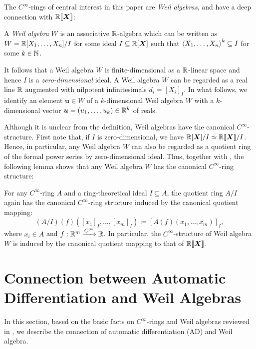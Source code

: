 The $C^\infty$-rings of central interest in this paper are \emph{Weil algebras}, and have a deep connection with $\mathord{\mathbb{R}\llbracket\boldsymbol{X}\rrbracket}$:

\begin{definition}
  A \emph{Weil algebra} $W$ is an associative $\mathbb{R}$-algebra which can be written as $W = \mathbb{R}[X_1, \dots, X_n]/I$ for some ideal $I \subseteq \mathbb{R}[\boldsymbol{X}]$ such that $\braket{X_1, \dots, X_n}^k \subseteq I$ for some $k \in \mathbb{N}$.
\end{definition}
It follows that a Weil algebra $W$ is finite-dimensional as a $\mathbb{R}$-linear space and hence $I$ is a \emph{zero-dimensional} ideal.
A Weil algebra $W$ can be regarded as a real line $\mathbb{R}$ augmented with nilpotent infinitesimals $d_i = {[X_i]}_I$.
In what follows, we identify an element $\boldsymbol{u} \in W$ of a $k$-dimensional Weil algebra $W$ with a $k$-dimensional vector $\boldsymbol{u} = (u_1, \dots, u_k) \in \mathbb{R}^k$ of reals.

Although it is unclear from the definition, Weil algebras have the canonical $C^\infty$-structure.
First note that, if $I$ is zero-dimensional, we have $\mathbb{R}[\boldsymbol{X}]/I \simeq \mathbb{R}\llbracket \boldsymbol{X} \rrbracket /I$.
Hence, in particular, any Weil algebra $W$ can also be regarded as a quotient ring of the formal power series by zero-dimensional ideal.
Thus, together with , the following lemma shows that any Weil algebra $W$ has the canonical $C^\infty$-ring structure:

\begin{lemma}\label{lem:quot-ring-ideal}
  For any $C^\infty$-ring $A$ and a ring-theoretical ideal $I \subseteq A$, the quotient ring $A/I$ again has the canonical $C^\infty$-ring structure induced by the canonical quotient mapping:
  \[
    (A/I)(f)([x_1]_I, \dots, [x_m]_I) \coloneqq \left[ A(f)(x_1, \dots, x_m) \right]_I,
  \]
  where $x_i \in A$ and $f: \mathbb{R}^m \xrightarrow{C^\infty} \mathbb{R}$.
  In particular, the $C^\infty$-structure of Weil algebra $W$ is induced by the canonical quotient mapping to that of $\mathord{\mathbb{R}\llbracket\boldsymbol{X}\rrbracket}$.
\end{lemma}

\section{Connection between Automatic Differentiation and Weil Algebras}
\label{sec:ad-and-weils}
In this section, based on the basic facts on $C^\infty$-rings and Weil algebras reviewed in , we describe the connection of automatic differentiation (AD) and Weil algebra.

